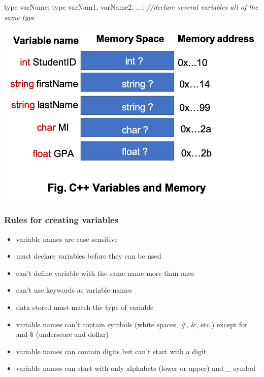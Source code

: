 \documentclass[11pt]{article}
\providecommand{\tightlist}{%
      \setlength{\itemsep}{0pt}\setlength{\parskip}{0pt}}
\newenvironment{Shaded}{}{}
\newcommand{\CommentTok}[1]{\textcolor[rgb]{0.38,0.63,0.69}{\textit{{#1}}}}
\newcommand{\NormalTok}[1]{{#1}}
\newcommand{\OperatorTok}[1]{\textcolor[rgb]{0.40,0.40,0.40}{{#1}}}
\begin{document}
\begin{Shaded}
\begin{Highlighting}[]
\NormalTok{type varName}\OperatorTok{;}
\NormalTok{type varNam1}\OperatorTok{,}\NormalTok{ varName2}\OperatorTok{,} \OperatorTok{...;} \CommentTok{//declare several variables all of the same type}
\end{Highlighting}
\end{Shaded}

\includegraphics{resources/VariablesAndMemory.png}

\hypertarget{rules-for-creating-variables}{%
\subsubsection{Rules for creating
variables}\label{rules-for-creating-variables}}

\begin{itemize}
\tightlist
\item
  variable names are case sensitive
\item
  must declare variables before they can be used
\item
  can't define variable with the same name more than once
\item
  can't use keywords as variable names
\item
  data stored must match the type of variable
\item
  variable names can't contain symbols (white spaces, \#, \&, etc.)
  except for \_ and \$ (underscore and dollar)
\item
  variable names can contain digits but can't start with a digit
\item
  variable names can start with only alphabets (lower or upper) and \_
  symbol
\end{itemize}
\end{document}
